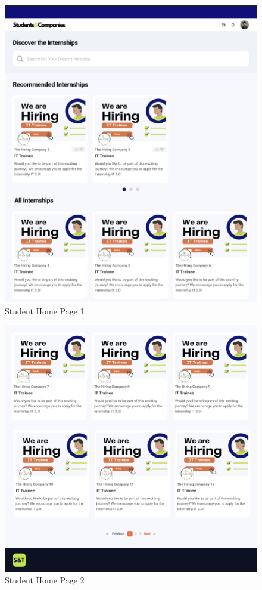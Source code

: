 \documentclass[a4paper,12pt]{article}
\begin{document}
    \begin{figure}[H]
    \centering
    \includegraphics[scale = 0.40]{figures/UserInterfaces/Student/HomePage1.png}
    \caption{Student Home Page 1}
     \centering
\end{figure}

\begin{figure}[H]
    \centering
    \includegraphics[scale = 0.40]{figures/UserInterfaces/Student/HomePage2.png}
    \caption{Student Home Page 2}
     \centering
\end{figure}
\end{document}
